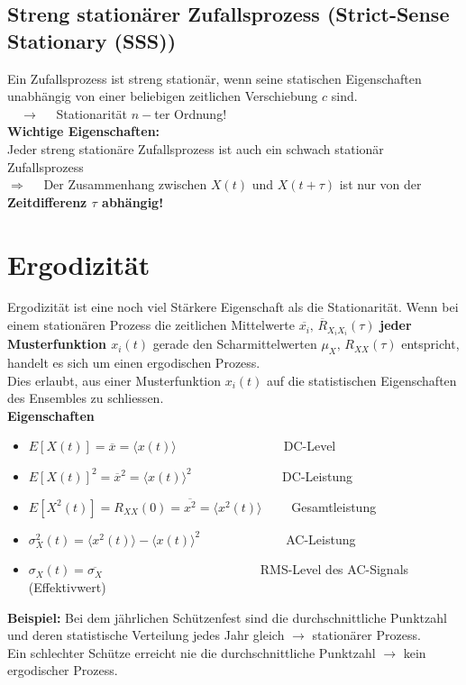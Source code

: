 			\subsection{Streng stationärer Zufallsprozess (Strict-Sense Stationary (SSS))}
				Ein Zufallsprozess ist streng stationär, wenn seine statischen Eigenschaften unabhängig von einer beliebigen zeitlichen Verschiebung $c$ sind.\\[0.2cm]
				$\quad \rightarrow\quad$ Stationarität $n-$ter Ordnung!\\[0.3cm]
				\textbf{Wichtige Eigenschaften:}\\[0.2cm]
				Jeder streng stationäre Zufallsprozess ist auch ein schwach stationär Zufallsprozess\\[0.1cm]
				$\Rightarrow\quad$ Der Zusammenhang zwischen $X(t)$ und $X(t+\tau)$ ist nur von der \textbf{Zeitdifferenz $\tau$ abhängig!}
\newpage
		\section{Ergodizität}
			Ergodizität ist eine noch viel Stärkere Eigenschaft als die Stationarität. Wenn bei einem stationären Prozess die zeitlichen Mittelwerte $\overline{x_i},\,\overline{R}_{X_iX_i}(\tau)$ \textbf{jeder Musterfunktion $x_i(t)$} gerade den Scharmittelwerten $ \mu_X,\,R_{XX}(\tau)$ entspricht, handelt es sich um einen ergodischen Prozess.\\[0.2cm]
			$\qquad$
			\\[0.2cm]
			Dies erlaubt, aus einer Musterfunktion $x_i(t)$ auf die statistischen Eigenschaften des Ensembles zu schliessen.\\[0.2cm]
			\textbf{Eigenschaften}
			\begin{itemize}
				\item $E[X(t)] = \overline{x} = \langle x(t) \rangle\qquad\qquad\qquad\qquad\,$ DC-Level
				\item $E[X(t)]^2 = \overline{x}^2 = \langle x(t) \rangle^2 \qquad\qquad\qquad\;\;\;$ DC-Leistung
				\item $E[X^2(t)] = R_{XX}(0) = \overline{x^2} = \langle x^2(t) \rangle\qquad$ Gesamtleistung
				\item $\sigma_X^2(t) = \langle x^2(t)\rangle-\langle x(t)\rangle^2\quad\qquad\qquad\quad\;\,$ AC-Leistung
				\item $\sigma_X(t) = \overline{\sigma_X}\qquad\qquad\qquad\qquad\qquad\qquad\,$ RMS-Level des AC-Signals (Effektivwert)
			\end{itemize}
			\textbf{Beispiel:} Bei dem jährlichen Schützenfest sind die durchschnittliche Punktzahl und deren statistische Verteilung jedes Jahr gleich $\rightarrow$ stationärer Prozess.\\ Ein schlechter Schütze erreicht nie die durchschnittliche Punktzahl $\rightarrow$ kein ergodischer Prozess.

